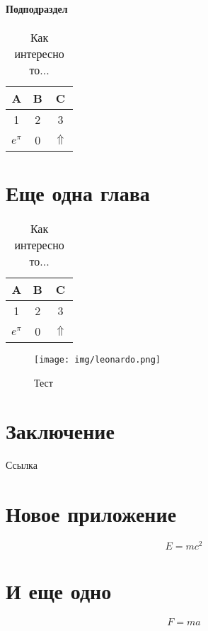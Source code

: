 \documentclass[12pt, rusmathsym]{nirreportnew}
\begin{document}
\subsubsection{Подподраздел}

\lipsum[1]

\begin{table}[ht]
	\caption{Как интересно то...}
	\centering
	\begin{tabular}{ccc} \hline
		A           & B & C            \\ \hline
		1           & 2 & 3            \\
		\(e^{\pi}\) & 0 & \(\Uparrow\) \\ \hline
	\end{tabular}
\end{table}

\chapter{Еще одна глава}

\lipsum[1]

\begin{table}[!ht]
	\caption{Как интересно то...}
	\centering
	\begin{tabular}{ccc} \hline
		A           & B & C            \\ \hline
		1           & 2 & 3            \\
		\(e^{\pi}\) & 0 & \(\Uparrow\) \\ \hline
	\end{tabular}
\end{table}

\lipsum[1]

\begin{figure}[!ht]
	\begin{center}
		\texttt{[image: img/leonardo.png]}
	\end{center}
	\caption{Тест}
\end{figure}

\chapter*{Заключение}

Ссылка~\cite{Pup09}

\lipsum[1]

% 
% 
\printbibliography

\appendix

\chapter{Новое приложение}

\[ E = m c^2 \]

\chapter{И еще одно}

\[ F = m a \]
\end{document}
